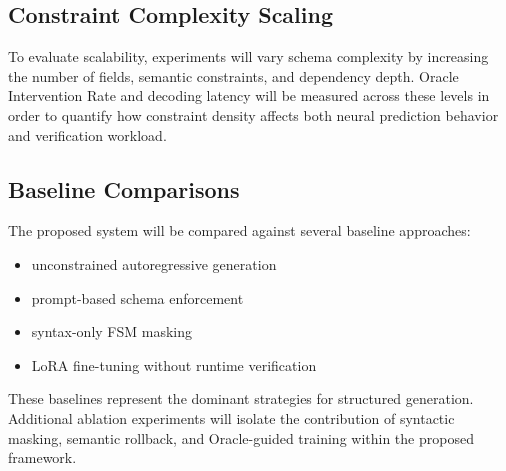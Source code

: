 \subsection{Constraint Complexity Scaling}
To evaluate scalability, experiments will vary schema complexity by
increasing the number of fields, semantic constraints, and dependency depth.
Oracle Intervention Rate and decoding latency will be measured across these
levels in order to quantify how constraint density affects both neural
prediction behavior and verification workload.

\subsection{Baseline Comparisons}
The proposed system will be compared against several baseline approaches:

\begin{itemize}
\item unconstrained autoregressive generation
\item prompt-based schema enforcement
\item syntax-only FSM masking
\item LoRA fine-tuning without runtime verification
\end{itemize}

These baselines represent the dominant strategies for structured generation.
Additional ablation experiments will isolate the contribution of syntactic
masking, semantic rollback, and Oracle-guided training within the proposed
framework.